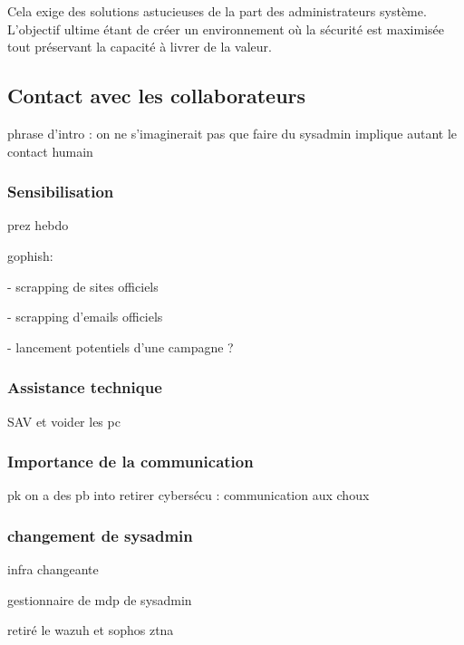 Cela exige des solutions astucieuses de la part des administrateurs système.
L'objectif ultime étant de créer un environnement où la sécurité est maximisée tout préservant la capacité à livrer de la valeur.

\subsection{Contact avec les collaborateurs}
phrase d'intro : on ne s'imaginerait pas que faire du sysadmin implique autant le contact humain 
\subsubsection{Sensibilisation}
prez hebdo

gophish:

- scrapping de sites officiels

- scrapping d'emails officiels

- lancement potentiels d'une campagne ?

\subsubsection{Assistance technique}
SAV et voider les pc

\subsubsection{Importance de la communication}
pk on a des pb into retirer cybersécu : communication aux choux

\subsubsection{changement de sysadmin}
infra changeante

gestionnaire de mdp de sysadmin

retiré le wazuh et sophos ztna
